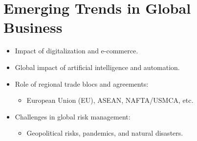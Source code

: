 \section{Emerging Trends in Global Business}
\begin{itemize}
    \item Impact of digitalization and e-commerce.
    \item Global impact of artificial intelligence and automation.
    \item Role of regional trade blocs and agreements:
    \begin{itemize}
        \item European Union (EU), ASEAN, NAFTA/USMCA, etc.
    \end{itemize}
    \item Challenges in global risk management:
    \begin{itemize}
        \item Geopolitical risks, pandemics, and natural disasters.
    \end{itemize}
\end{itemize}